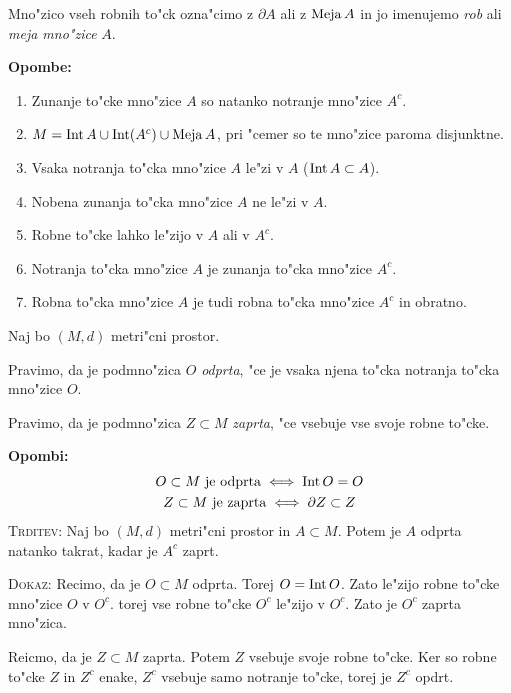 Mno"zico vseh robnih to"ck ozna"cimo z $\partial A$ ali z $\operatorname{Meja} A$ in jo imenujemo \emph{rob} ali \emph{meja mno"zice} $A$.

\textbf{Opombe:}
\begin{enumerate}
    \item Zunanje to"cke mno"zice $A$ so natanko notranje mno"zice $A^c$.
    \item $M = \operatorname{Int} A \cup \operatorname{Int}(A^c) \cup \operatorname{Meja} A$, pri "cemer so te mno"zice paroma disjunktne.
    \item Vsaka notranja to"cka mno"zice $A$ le"zi v $A$ ($\operatorname{Int} A \subset A$).
    \item Nobena zunanja to"cka mno"zice $A$ ne le"zi v $A$.
    \item Robne to"cke lahko le"zijo v $A$ ali v $A^c$.
    \item Notranja to"cka mno"zice $A$ je zunanja to"cka mno"zice $A^c$.
    \item Robna to"cka mno"zice $A$ je tudi robna to"cka mno"zice $A^c$ in obratno.
\end{enumerate}
%
 Naj bo $(M, d)$ metri"cni prostor.

 Pravimo, da je podmno"zica $O$ \emph{odprta}, "ce je vsaka njena to"cka notranja to"cka mno"zice $O$.

Pravimo, da je podmno"zica $Z \subset M$ \emph{zaprta}, "ce vsebuje vse svoje robne to"cke.

\textbf{Opombi:}
\begin{gather*}
O \subset M \text{ je odprta} \iff \operatorname{Int} O = O \\
Z \subset M \text{ je zaprta} \iff \partial Z \subset Z
\end{gather*}
%
\textsc{Trditev:} Naj bo $(M, d)$ metri"cni prostor in $A \subset M$. Potem je $A$ odprta natanko takrat, kadar je $A^c$ zaprt.

\textsc{Dokaz:} Recimo, da je $O \subset M$ odprta. Torej $O = \operatorname{Int} O$. Zato le"zijo robne to"cke mno"zice $O$ v $O^c$. torej vse robne to"cke $O^c$ le"zijo v $O^c$. Zato je $O^c$ zaprta mno"zica.

Reicmo, da je $Z \subset M$ zaprta. Potem $Z$ vsebuje svoje robne to"cke. Ker so robne to"cke $Z$ in $Z^c$ enake, $Z^c$ vsebuje samo notranje to"cke, torej je $Z^c$ opdrt.